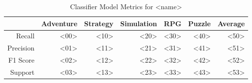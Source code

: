 \begin{table}[h]
    \centering
    \begin{tabular}{r|r|r|r|r|r|r}
        & Adventure & Strategy & Simulation & RPG & Puzzle & Average \\\hline
        Recall      & <00> & <10> & <20> & <30> & <40> & <50>\\
        Precision   & <01> & <11> & <21> & <31> & <41> & <51>\\
        F1 Score    & <02> & <12> & <22> & <32> & <42> & <52>\\
        Support     & <03> & <13> & <23> & <33> & <43> & <53>
\end{tabular}
    \caption{Classifier Model Metrics for <name>}
    \label{tab:model_metrics}
\end{table}